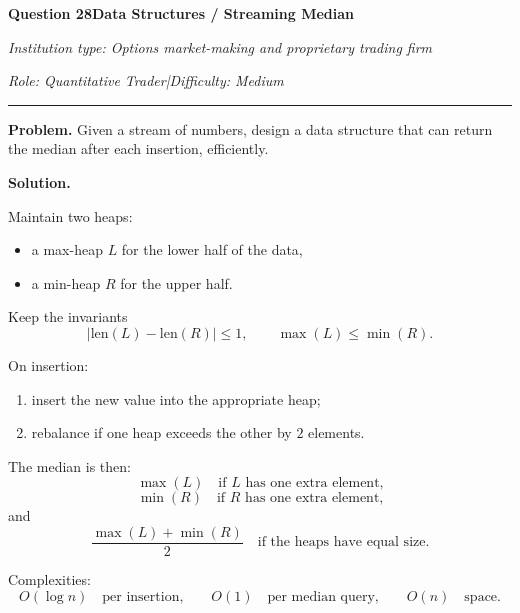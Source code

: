 \documentclass[11pt,letterpaper,openany]{book}
\newcommand{\InterviewQuestionHeader}[5]{%
  \vspace{1.0em}%
  {\large\bfseries #1\enspace #4\par}%
  {\small\itshape Institution type: #2\par}%
  {\small\itshape Role: #3\enspace |\enspace Difficulty: #5\par}%
  \vspace{0.25em}\hrule\vspace{0.45em}%
}
\begin{document}
\InterviewQuestionHeader{Question 28}{Options market-making and proprietary trading firm}{Quantitative Trader}{Data Structures / Streaming Median}{Medium}
\textbf{Problem.} Given a stream of numbers, design a data structure that can return the median after each insertion, efficiently.

\textbf{Solution.}

Maintain two heaps:
\begin{itemize}
\item a max-heap \(L\) for the lower half of the data,
\item a min-heap \(R\) for the upper half.
\end{itemize}

Keep the invariants
\[
|\mathrm{len}(L)-\mathrm{len}(R)| \le 1,
\qquad
\max(L) \le \min(R).
\]

On insertion:
\begin{enumerate}
\item insert the new value into the appropriate heap;
\item rebalance if one heap exceeds the other by \(2\) elements.
\end{enumerate}

The median is then:
\[
\max(L)
\quad \text{if } L \text{ has one extra element,}
\]
\[
\min(R)
\quad \text{if } R \text{ has one extra element,}
\]
and
\[
\frac{\max(L)+\min(R)}{2}
\quad \text{if the heaps have equal size.}
\]

Complexities:
\[
O(\log n)
\quad \text{per insertion,}
\qquad
O(1)
\quad \text{per median query,}
\qquad
O(n)
\quad \text{space.}
\]
\end{document}
